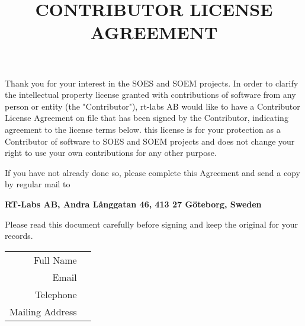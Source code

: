 \documentclass[10pt,a4paper]{article}
\title{CONTRIBUTOR LICENSE AGREEMENT}
\author{}
\date{}
\begin{document}
\thispagestyle{empty}
\maketitle
\small
Thank you for your interest in the SOES and SOEM projects. In order to clarify the intellectual property license granted with contributions of software from any person or entity (the "Contributor"), rt-labs AB would like to have a Contributor License Agreement on file that has been signed by the Contributor, indicating agreement to the license terms below. this license is for your protection as a Contributor of software to SOES and SOEM projects and does not change your right to use your own contributions for any other purpose.

If you have not already done so, please complete this Agreement and send a copy by regular mail to
\begin{center}
\textbf{RT-Labs AB, Andra Långgatan 46, 413 27 Göteborg, Sweden}
\end{center}
Please read this document carefully before signing and keep the original for your records.

\medskip
\begin{tabularx}{\textwidth}{rX}
Full Name & \hrulefill \\
Email & \hrulefill \\
Telephone & \hrulefill \\
Mailing Address & \hrulefill \\
\end{tabularx}
\medskip
\end{document}
